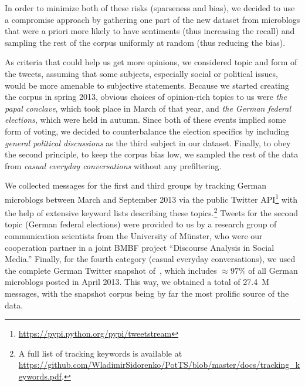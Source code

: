 In order to minimize both of these risks (sparseness and bias), we
decided to use a compromise approach by gathering one part of the new
dataset from microblogs that were a priori more likely to have
sentiments (thus increasing the recall) and sampling the rest of the
corpus uniformly at random (thus reducing the bias).

As criteria that could help us get more opinions, we considered topic
and form of the tweets, assuming that some subjects, especially social
or political issues, would be more amenable to subjective statements.
Because we started creating the corpus in spring 2013, obvious choices
of opinion-rich topics to us were \emph{the papal conclave}, which
took place in March of that year, and \emph{the German federal
  elections}, which were held in autumn.  Since both of these events
implied some form of voting, we decided to counterbalance the election
specifics by including \emph{general political discussions} as the
third subject in our dataset.  Finally, to obey the second principle,
\ie{} to keep the corpus bias low, we sampled the rest of the data
from \emph{casual everyday conversations} without any prefiltering.

We collected messages for the first and third groups by tracking
German microblogs between March and September 2013 via the public
Twitter API\footnote{\url{https://pypi.python.org/pypi/tweetstream}}
with the help of extensive keyword lists describing these
topics.\footnote{A full list of tracking keywords is available at
  \url{https://github.com/WladimirSidorenko/PotTS/blob/master/docs/tracking_keywords.pdf}.}
Tweets for the second topic (German federal elections) were provided
to us by a research group of communication scientists from the
University of M\"unster, who were our cooperation partner in a joint
BMBF project ``Discourse Analysis in Social Media.''  Finally, for the
fourth category (casual everyday conversations), we used the complete
German Twitter snapshot of~\citet{Scheffler:14}, which includes
$\approx97\%$ of all German microblogs posted in April 2013.  This
way, we obtained a total of 27.4~M messages, with the snapshot corpus
being by far the most prolific source of the data.


